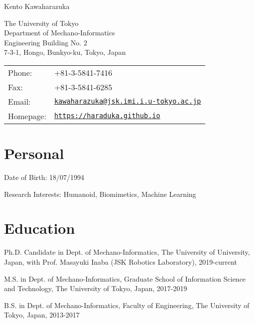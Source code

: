 \documentclass[letterpaper]{article}
\def\name{Kento Kawaharazuka}
\renewenvironment{itemize}{
  \begin{list}{}{
    \setlength{\leftmargin}{1.5em}
  }
}{
  \end{list}
}
\begin{document}
{\huge \name}

\vspace{0.25in}

\begin{minipage}{0.45\linewidth}
  {The University of Tokyo} \\
  Department of Mechano-Informatics \\
  Engineering Building No. 2 \\
  7-3-1, Hongo, Bunkyo-ku, Tokyo, Japan
\end{minipage}
\begin{minipage}{0.45\linewidth}
  \begin{tabular}{ll}
    Phone: & +81-3-5841-7416 \\
    Fax: &  +81-3-5841-6285 \\
    Email: & \href{mailto:kawaharazuka@jsk.imi.i.u-tokyo.ac.jp}{\tt kawaharazuka@jsk.imi.i.u-tokyo.ac.jp} \\
    Homepage: & \href{https://haraduka.github.io}{\tt https://haraduka.github.io} \\
  \end{tabular}
\end{minipage}


\section*{Personal}

\begin{itemize}
    \item Date of Birth: 18/07/1994
    \item Research Interests: Humanoid, Biomimetics, Machine Learning
\end{itemize}


\section*{Education}

\begin{itemize}
  \item Ph.D. Candidate in Dept. of Mechano-Informatics, The University of University, Japan, with Prof. Masayuki Inaba (JSK Robotics Laboratory), 2019-current
  \item M.S. in Dept. of Mechano-Informatics, Graduate School of Information Science and Technology, The University of Tokyo, Japan, 2017-2019
  \item B.S. in Dept. of Mechano-Informatics, Faculty of Engineering, The University of Tokyo, Japan, 2013-2017
\end{itemize}
\end{document}
